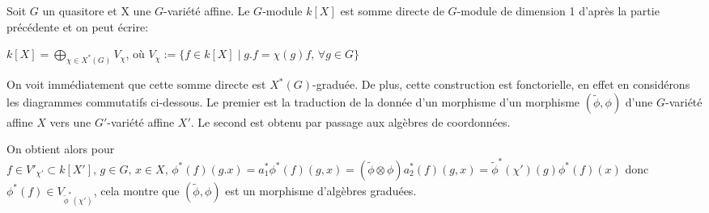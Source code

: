 \begin{cons}
Soit $G$ un quasitore et X une $G$-variété affine. Le $G$-module $k[X]$ est somme directe de $G$-module de dimension 1 d'après la partie précédente et on peut écrire: 
\begin{center}
$k[X]=\bigoplus_{\chi \in X^*(G)}V_\chi$,  où $V_\chi:=\lbrace f\in k[X]\mid g.f=\chi(g)f,\, \forall g\in G \rbrace$ 
\end{center}
On voit immédiatement que cette somme directe est $X^*(G)$-graduée. De plus, cette construction est fonctorielle, en effet en considérons les diagrammes commutatifs ci-dessous. Le premier est la traduction de la donnée d'un morphisme d'un morphisme $(\widetilde{\phi},\phi)$ d'une $G$-variété affine $X$ vers une $G'$-variété affine $X'$. Le second est obtenu par passage aux algèbres de coordonnées.
\begin{multicols}{2}
	\begin{center}
	\end{center}

	\columnbreak
	\begin{center}
	\end{center}
\end{multicols}
On obtient alors pour $f\in V'_{\chi'}\subset k[X'],\,g\in G,\,x\in X,\, \phi^*(f)(g.x)=a_1^*\phi^*(f)(g, x)=(\widetilde{\phi}\otimes\phi)a_2^*(f)(g,x)=\widetilde{\phi}^*(\chi')(g)\phi^*(f)(x)$ donc $\phi^*(f)\in V_{\widetilde{\phi}^*(\chi')}$, cela montre que $(\widetilde{\phi},\phi)$ est un morphisme d'algèbres graduées.
\end{cons}


